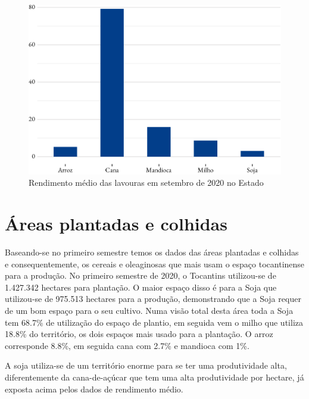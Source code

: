 \begin{figure}[h]
	\caption{Rendimento médio das lavouras em setembro de 2020 no Estado}
	\includegraphics{fig/rendim_medio-1.pdf}
\end{figure}

\section{Áreas plantadas e colhidas}

\par Baseando-se no primeiro semestre temos os dados das áreas plantadas e colhidas e consequentemente, os cereais e oleaginosas que mais usam o espaço tocantinense para a produção. No primeiro semestre de 2020, o Tocantins utilizou-se de 1.427.342 hectares para plantação. O maior espaço disso é para a Soja que utilizou-se de 975.513 hectares para a produção, demonstrando que a Soja requer de um bom espaço para o seu cultivo. Numa visão total desta área toda a Soja tem 68.7\% de utilização do espaço de plantio, em seguida vem o milho que utiliza 18.8\% do território, os dois espaços mais usado para a plantação. O arroz corresponde 8.8\%, em seguida cana com 2.7\% e mandioca com 1\%.

\par A soja utiliza-se de um território enorme para se ter uma produtividade alta, diferentemente da cana-de-açúcar que tem uma alta produtividade por hectare, já exposta acima pelos dados de rendimento médio.

